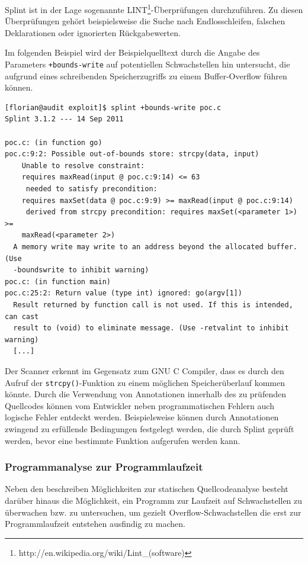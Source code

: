 Splint ist in der Lage sogenannte LINT\footnote{http://en.wikipedia.org/wiki/Lint\_(software)}-Überprüfungen durchzuführen. Zu diesen Überprüfungen gehört beispielsweise die Suche nach Endlosschleifen, falschen Deklarationen oder ignorierten Rückgabewerten.

Im folgenden Beispiel wird der Beispielquelltext durch die Angabe des Parameters \texttt{+bounds-write} auf potentiellen Schwachstellen hin untersucht, die aufgrund eines schreibenden Speicherzugriffs zu einem Buffer-Overflow führen können.

\begin{lstlisting}[basicstyle=\ttfamily\footnotesize]
[florian@audit exploit]$ splint +bounds-write poc.c
Splint 3.1.2 --- 14 Sep 2011

poc.c: (in function go)
poc.c:9:2: Possible out-of-bounds store: strcpy(data, input)
    Unable to resolve constraint:
    requires maxRead(input @ poc.c:9:14) <= 63
     needed to satisfy precondition:
    requires maxSet(data @ poc.c:9:9) >= maxRead(input @ poc.c:9:14)
     derived from strcpy precondition: requires maxSet(<parameter 1>) >=
    maxRead(<parameter 2>)
  A memory write may write to an address beyond the allocated buffer. (Use
  -boundswrite to inhibit warning)
poc.c: (in function main)
poc.c:25:2: Return value (type int) ignored: go(argv[1])
  Result returned by function call is not used. If this is intended, can cast
  result to (void) to eliminate message. (Use -retvalint to inhibit warning)
  [...]
\end{lstlisting}

Der Scanner erkennt im Gegensatz zum GNU C Compiler, dass es durch den Aufruf der \texttt{strcpy()}-Funktion zu einem möglichen Speicherüberlauf kommen könnte. Durch die Verwendung von Annotationen innerhalb des zu prüfenden Quellcodes können vom Entwickler neben programmatischen Fehlern auch logische Fehler entdeckt werden. Beispielsweise können durch  Annotationen zwingend zu erfüllende Bedingungen festgelegt werden, die durch Splint geprüft werden, bevor eine bestimmte Funktion aufgerufen werden kann.

\subsubsection{Programmanalyse zur Programmlaufzeit}

Neben den beschreiben Möglichkeiten zur statischen Quellcodeanalyse besteht darüber hinaus die Möglichkeit, ein Programm zur Laufzeit auf Schwachstellen zu überwachen bzw. zu untersuchen, um gezielt Overflow-Schwachstellen die erst zur Programmlaufzeit entstehen ausfindig zu machen.

